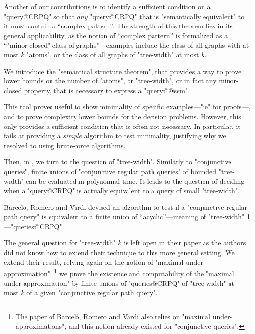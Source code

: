 Another of our contributions is to identify a sufficient condition
on a "query@CRPQ" so that \emph{any} "query@CRPQ" that is "semantically equivalent" to it
must contain a ``complex pattern''. The strength of this theorem lies in its
general applicability, as the notion of ``complex pattern''
is formalized as a ``"minor-closed" class
of graphs''---examples include the class of all graphs with at most $k$ "atoms",
or the class of all graphs of "tree-width" at most $k$.

\begin{contribution}
	We introduce the "semantical structure theorem", that provides
	a way to prove lower bounds on the number
	of "atoms", or "tree-width", or in fact any minor-closed property,
	that is necessary to express a "query@@sem".
\end{contribution}

This tool proves useful to show minimality of specific examples---"ie"
for proofs---, and to prove complexity lower bounds for the decision problems.
However, this only provides a sufficient condition that is often not
necessary. In particular, it fails at providing a \emph{simple} algorithm to test minimality, justifying why we resolved to using brute-force algorithms.

\bigskip
Then, in , we turn to the question
of "tree-width". Similarly to "conjunctive queries", finite unions of
"conjunctive regular path queries"
of bounded "tree-width" can be evaluated in polynomial time.
It leads to the question of deciding when a "query@CRPQ" is actually equivalent
to a query of small "tree-width".

\begin{known}
	Barceló, Romero and Vardi \cite{BarceloRomeroVardi2016SemanticAcyclicity}
	devised an algorithm to test
	if a "conjunctive regular path query" is equivalent to
	a finite union of ``acyclic''---meaning of "tree-width" 1---"queries@CRPQ".
\end{known}

The general question for "tree-width" $k$ is left open in their paper as the authors did not know how to extend their technique to this
more general setting. We extend their result, relying again on the notion
of "maximal under-approximation":%
\footnote{The paper of Barceló, Romero and Vardi
also relies on "maximal under-approximations", and this notion already existed
for "conjunctive queries".}
we prove the existence and computability of the "maximal under-approximation"
by finite unions of "queries@CRPQ" of "tree-width" at most $k$ of a given
"conjunctive regular path query".

